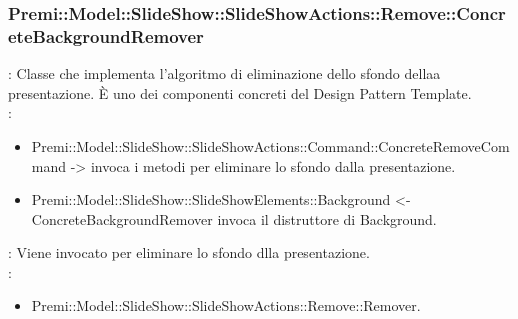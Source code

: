 {			 \subsubsection{Premi::Model::SlideShow::SlideShowActions::Remove::ConcreteBackgroundRemover}{
							\textbf{\tipo}: Classe che implementa l'algoritmo di eliminazione dello sfondo dellaa presentazione.
			È uno dei componenti concreti del Design Pattern Template.\\	
							\textbf{\relaz}: 
							\begin{itemize}
								\item Premi::Model::SlideShow::SlideShowActions::Command::ConcreteRemoveCommand -> invoca i metodi per eliminare lo sfondo dalla presentazione.
                                \item Premi::Model::SlideShow::SlideShowElements::Background <- ConcreteBackgroundRemover invoca il distruttore di Background.
							\end{itemize} 
							\textbf{\interfacce}: Viene invocato per eliminare lo sfondo dlla presentazione.\\
			                \textbf{\base}: 
			                    \begin{itemize}
			                    \item Premi::Model::SlideShow::SlideShowActions::Remove::Remover.
			                    \end{itemize}
						}
	}

